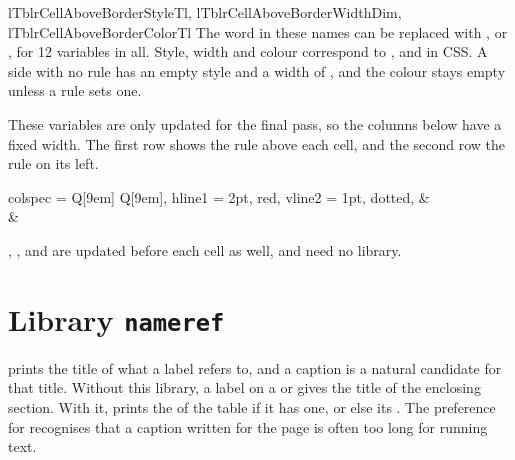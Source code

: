 \begin{codedescribe}[
        code,
        new=2024A
    ]{lTblrCellAboveBorderStyleTl, lTblrCellAboveBorderWidthDim, lTblrCellAboveBorderColorTl}
    The word  in these names can be replaced with ,  or , for 12 variables in all. Style, width and colour correspond to ,  and  in CSS. A side with no rule has an empty style and a width of \val{0pt}, and the colour stays empty unless a rule sets one.

    These variables are only updated for the final pass, so the columns below have a fixed width. The first row shows the rule above each cell, and the second row the rule on its left.

    \begin{codestore}[st=lib:html]
        \newcommand\showAbove{%
            \lTblrCellAboveBorderStyleTl{}
            \the\lTblrCellAboveBorderWidthDim{}
            \lTblrCellAboveBorderColorTl}
        \newcommand\showLeft{%
            \lTblrCellLeftBorderStyleTl{}
            \the\lTblrCellLeftBorderWidthDim{}
            \lTblrCellLeftBorderColorTl}
        \begin{tblr}{
                colspec = {Q[9em] Q[9em]},
                hline{1} = {2pt, red},
                vline{2} = {1pt, dotted},
            }
            \showAbove & \showAbove \\
            \showLeft  & \showLeft
        \end{tblr}\end{codestore}
    \begin{center}
    \end{center}
    \begin{tsremark}
        \tsobj[code]{\lTblrCellRowSpanInt}, \tsobj[code]{\lTblrCellColSpanInt}, \tsobj[code]{\lTblrCellOmittedBool} and \tsobj[code]{\lTblrCellBackgroundTl} are updated before each cell as well, and need no library.
    \end{tsremark}
\end{codedescribe}

\section{Library \texttt{nameref}}\label{lib:nameref}
 prints the title of what a label refers to, and a caption is a natural candidate for that title. Without this library, a label on a  or  gives the title of the enclosing section. With it,  prints the  of the table if it has one, or else its . The preference for  recognises that a caption written for the page is often too long for running text.

